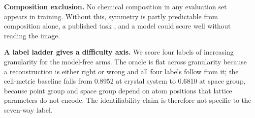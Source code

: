 \textbf{Composition exclusion.} No chemical composition in any evaluation set appears in training. Without
this, symmetry is partly predictable from composition alone, a published task \citep{cryspnet2003}, and a
model could score well without reading the image.

\textbf{A label ladder gives a difficulty axis.} We score four labels of increasing granularity for the
model-free arms. The oracle is flat across granularity because a
reconstruction is either right or wrong and all four labels follow from it; the cell-metric baseline falls
from 0.8952 at crystal system to 0.6810 at space group, because point group and space group depend on atom
positions that lattice parameters do not encode. The identifiability claim is therefore not specific to the
seven-way label.
